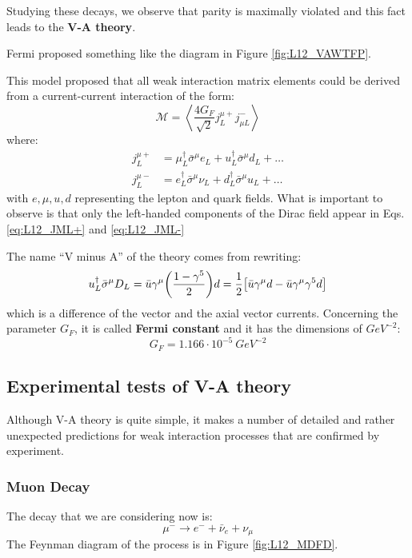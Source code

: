 \documentclass[../../main/main.tex]{subfiles}
\begin{document}
Studying these decays, we observe that parity is maximally violated and this fact leads to the \textbf{V-A theory}.

Fermi proposed something like the diagram in Figure \ref{fig:L12_VAWTFP}.


This model proposed that all weak interaction matrix elements could be derived from a current-current interaction of the form:
\begin{equation}
	\mathcal{M}
	=
	\left\langle
	\frac{4G_F}{\sqrt{2}} j^{\mu+}_L j_{\mu L}^{-}
	\right\rangle
	\label{eq:}
\end{equation}
where:
\begin{align}
	j^{\mu+}_L	&= \mu^{\dag}_L \bar{\sigma}^{\mu} e_L + u^{\dag}_L \bar{\sigma}^{\mu} d_L + \dots \label{eq:L12_JML+} \\
	j^{\mu-}_L	&= e^{\dag}_L \bar{\sigma}^{\mu} \nu_L + d^{\dag}_L \bar{\sigma}^{\mu} u_L + \dots \label{eq:L12_JML-}
\end{align}
with \( e, \mu, u, d \) representing the lepton and quark fields. What is important to observe is that only the left-handed components of the Dirac field appear in Eqs. \ref{eq:L12_JML+} and \ref{eq:L12_JML-}

The name ``V minus A'' of the theory comes from rewriting:
\begin{equation}
	u^{\dag}_L \bar{\sigma}^{\mu} D_L
	=
	\bar{u} \gamma^{\mu} \qty(\frac{1 - \gamma^5}{2}) d
	=
	\frac{1}{2} \qty[\bar{u} \gamma^{\mu} d - \bar{u} \gamma^{\mu} \gamma^5 d]
	\label{eq:}
\end{equation}
which is a difference of the vector and the axial vector currents. Concerning the parameter \( G_F \), it is called \textbf{Fermi constant} and it has the dimensions of \( \si{GeV^{-2}} \):
\begin{equation}
	G_F
	=
	1.166 \cdot 10^{-5} \ \si{GeV^{-2}}
	\label{eq:}
\end{equation}



\subsection{Experimental tests of V-A theory}
Although V-A theory is quite simple, it makes a number of detailed and rather unexpected predictions for weak interaction processes that are confirmed by experiment.

\subsubsection*{Muon Decay}
The decay that we are considering now is:
\begin{equation}
	\mu^-
	\longrightarrow
	e^- + \bar{\nu}_e + \nu_{\mu}
	\label{eq:}
\end{equation}
The Feynman diagram of the process is in Figure \ref{fig:L12_MDFD}.
\end{document}
